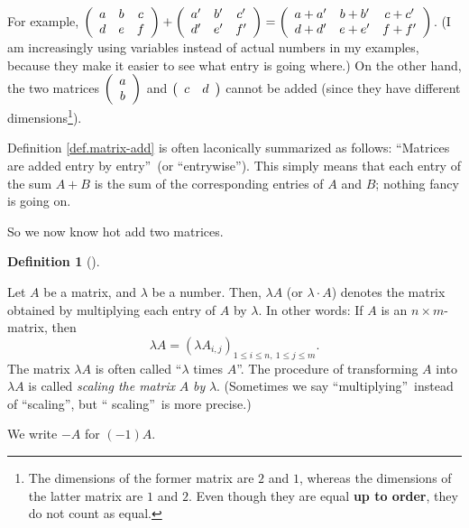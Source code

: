 \documentclass[numbers=enddot,12pt,final,onecolumn,notitlepage]{scrartcl}%
\theoremstyle{definition}
\newtheorem{defi}[theo]{Definition}
\newenvironment{definition}[1][]
{\begin{defi}[#1]\begin{leftbar}}
{\end{leftbar}\end{defi}}
\begin{document}
For example, $\left(
\begin{array}
[c]{ccc}%
a & b & c\\
d & e & f
\end{array}
\right)  +\left(
\begin{array}
[c]{ccc}%
a^{\prime} & b^{\prime} & c^{\prime}\\
d^{\prime} & e^{\prime} & f^{\prime}%
\end{array}
\right)  =\left(
\begin{array}
[c]{ccc}%
a+a^{\prime} & b+b^{\prime} & c+c^{\prime}\\
d+d^{\prime} & e+e^{\prime} & f+f^{\prime}%
\end{array}
\right)  $. (I am increasingly using variables instead of actual numbers in my
examples, because they make it easier to see what entry is going where.) On
the other hand, the two matrices $\left(
\begin{array}
[c]{c}%
a\\
b
\end{array}
\right)  $ and $\left(
\begin{array}
[c]{cc}%
c & d
\end{array}
\right)  $ cannot be added (since they have different dimensions\footnote{The
dimensions of the former matrix are $2$ and $1$, whereas the dimensions of the
latter matrix are $1$ and $2$. Even though they are equal \textbf{up to
order}, they do not count as equal.}).

Definition \ref{def.matrix-add} is often laconically summarized as follows:
\textquotedblleft Matrices are added entry by entry\textquotedblright\ (or
\textquotedblleft entrywise\textquotedblright). This simply means that each
entry of the sum $A+B$ is the sum of the corresponding entries of $A$ and $B$;
nothing fancy is going on.

So we now know hot add two matrices.

\begin{definition}
\label{def.matrix-scale}Let $A$ be a matrix, and $\lambda$ be a number. Then,
$\lambda A$ (or $\lambda\cdot A$) denotes the matrix obtained by multiplying
each entry of $A$ by $\lambda$. In other words: If $A$ is an $n\times
m$-matrix, then%
\[
\lambda A=\left(  \lambda A_{i,j}\right)  _{1\leq i\leq n,\ 1\leq j\leq m}.
\]
The matrix $\lambda A$ is often called \textquotedblleft$\lambda$ times
$A$\textquotedblright. The procedure of transforming $A$ into $\lambda A$ is
called \textit{scaling the matrix }$A$ \textit{by }$\lambda$. (Sometimes we
say \textquotedblleft multiplying\textquotedblright\ instead of
\textquotedblleft scaling\textquotedblright, but \textquotedblleft
scaling\textquotedblright\ is more precise.)

We write $-A$ for $\left(  -1\right)  A$.
\end{definition}
\end{document}
